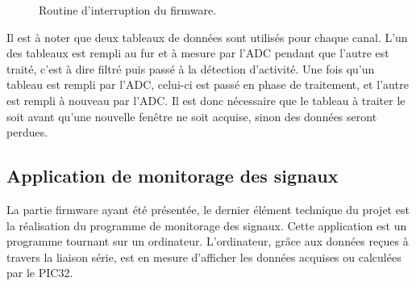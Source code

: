 \documentclass[letterpaper, twoside, 12pt, memoire, creativecommons, hyperref]{thETS}
\begin{document}
\begin{figure}
	\centering
	\caption{Routine d'interruption du firmware.}
	\label{fig:adc}
\end{figure}

Il est à noter que deux tableaux de données sont utilisés pour chaque canal. L'un des tableaux est rempli au fur et à mesure par l'ADC pendant que l'autre est traité, c'est à dire filtré puis passé à la détection d'activité. Une fois qu'un tableau est rempli par l'ADC, celui-ci est passé en phase de traitement, et l'autre est rempli à nouveau par l'ADC. Il est donc nécessaire que le tableau à traiter le soit avant qu'une nouvelle fenêtre ne soit acquise, sinon des données seront perdues. 

\subsection{Application de monitorage des signaux}

La partie firmware ayant été présentée, le dernier élément technique du projet est la réalisation du programme de monitorage des signaux. Cette application est un programme tournant sur un ordinateur. L'ordinateur, grâce aux données reçues à travers la liaison série, est en mesure d'afficher les données acquises ou calculées par le PIC32. 
\end{document}
